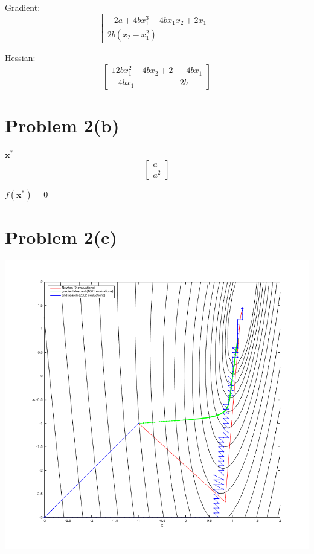 \documentclass{article}
\begin{document}
\begin{center}
Gradient:
\[
	\begin{bmatrix}
		-2a + 4bx_1^3 -4bx_1x_2 + 2x_1\\ 
		2b(x_2-x_1^2)
	\end{bmatrix}
\]

Hessian:
\[
	\begin{bmatrix}
		12bx_1^2-4bx_2+2 & -4bx_1\\
		-4bx_1 & 2b 
	\end{bmatrix}
\]
\end{center}

\section*{Problem 2(b)}


$\mathbf{x^{*}} = $
\[
	\begin{bmatrix}
		a \\
		a^2
	\end{bmatrix}
\]

$f(\mathbf{x^{*}}) = 0$
	

\section*{Problem 2(c)}


\includegraphics[scale=0.5]{code/2c.png}
\end{document}
